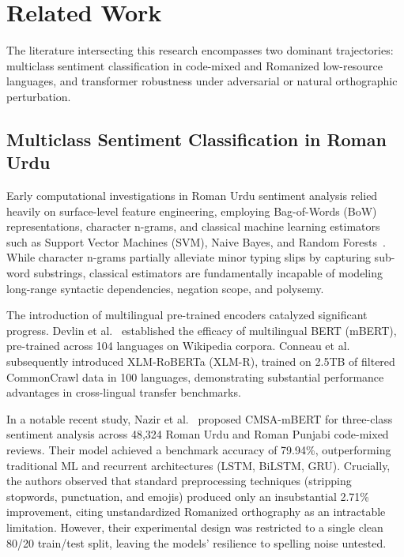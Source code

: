 \section{Related Work}
\label{sec:related_work}

The literature intersecting this research encompasses two dominant trajectories: multiclass sentiment classification in code-mixed and Romanized low-resource languages, and transformer robustness under adversarial or natural orthographic perturbation.

\subsection{Multiclass Sentiment Classification in Roman Urdu}
Early computational investigations in Roman Urdu sentiment analysis relied heavily on surface-level feature engineering, employing Bag-of-Words (BoW) representations, character n-grams, and classical machine learning estimators such as Support Vector Machines (SVM), Naive Bayes, and Random Forests~\cite{chandio2022sentiment}. While character n-grams partially alleviate minor typing slips by capturing sub-word substrings, classical estimators are fundamentally incapable of modeling long-range syntactic dependencies, negation scope, and polysemy.

The introduction of multilingual pre-trained encoders catalyzed significant progress. Devlin et al.~\cite{devlin2019bert} established the efficacy of multilingual BERT (mBERT), pre-trained across 104 languages on Wikipedia corpora. Conneau et al.~\cite{conneau2020unsupervised} subsequently introduced XLM-RoBERTa (XLM-R), trained on 2.5TB of filtered CommonCrawl data in 100 languages, demonstrating substantial performance advantages in cross-lingual transfer benchmarks. 

In a notable recent study, Nazir et al.~\cite{nazir2025leveraging} proposed CMSA-mBERT for three-class sentiment analysis across 48,324 Roman Urdu and Roman Punjabi code-mixed reviews. Their model achieved a benchmark accuracy of 79.94\%, outperforming traditional ML and recurrent architectures (LSTM, BiLSTM, GRU). Crucially, the authors observed that standard preprocessing techniques (stripping stopwords, punctuation, and emojis) produced only an insubstantial 2.71\% improvement, citing unstandardized Romanized orthography as an intractable limitation. However, their experimental design was restricted to a single clean 80/20 train/test split, leaving the models' resilience to spelling noise untested.

